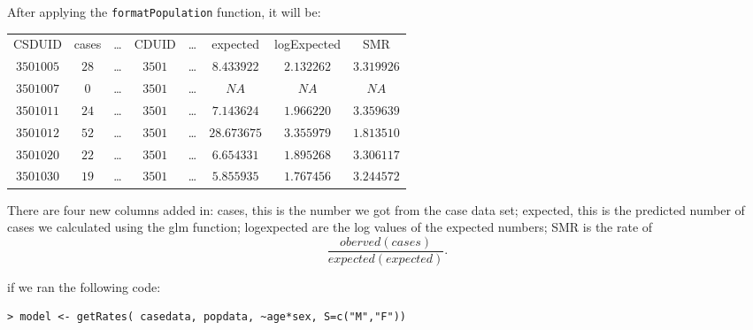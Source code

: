 \documentclass{article}
\begin{document}
After applying the \texttt{formatPopulation} function, it will be:
\begin{table}[ht]
\begin{center}
\begin{tabular}{cccccccc}
   CSDUID &    cases&\ldots & CDUID & \ldots &expected    &logExpected  &     SMR    \\
 $3501005$&    $28$& \ldots & $3501$& \ldots &$8.433922$  &  $2.132262$ &$3.319926 $ \\
 $3501007$&    $ 0$& \ldots & $3501$& \ldots &$      NA$  &  $      NA$ &$      NA $ \\
 $3501011$&    $24$& \ldots & $3501$& \ldots &$7.143624$  &  $1.966220$ &$3.359639 $ \\
 $3501012$&    $52$& \ldots & $3501$& \ldots &$28.673675$ &  $ 3.355979$&$ 1.813510$ \\
 $3501020$&    $22$& \ldots & $3501$& \ldots &$6.654331$  &  $1.895268$ &$3.306117 $ \\
 $3501030$&    $19$& \ldots & $3501$& \ldots &$5.855935$  &  $1.767456$ &$3.244572 $ \\
 \end{tabular}
 \end{center}
 \end{table}

There are four new columns added in: cases, this is the number we got from the case data set;
expected, this is the predicted number of cases we calculated using the glm function;
logexpected are the \mbox{log} values of the expected numbers; SMR is the rate of \[\frac {oberved(cases)}{expected(expected)}.\]

if we ran the following code:
\begin{verbatim}
> model <- getRates( casedata, popdata, ~age*sex, S=c("M","F"))
\end{verbatim}
\end{document}

